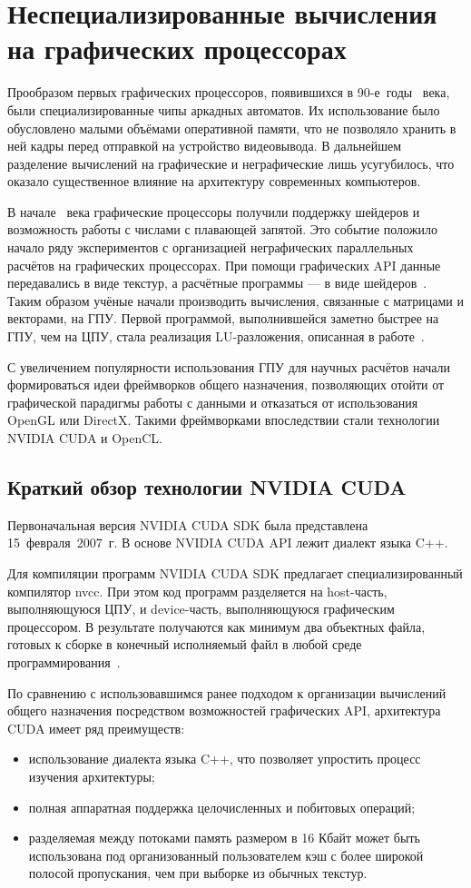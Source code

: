 \section{Неспециализированные вычисления на графических процессорах}

Прообразом первых графических процессоров, появившихся в 90-е~годы
~века, были специализированные чипы аркадных автоматов. Их использование было обусловлено малыми объёмами оперативной памяти, что не позволяло хранить в ней кадры перед отправкой на устройство видеовывода. В
дальнейшем разделение вычислений на графические и неграфические лишь
усугубилось, что оказало существенное влияние на архитектуру современных
компьютеров.

В начале ~века графические процессоры получили поддержку шейдеров и возможность работы с числами с плавающей запятой. Это событие положило начало ряду экспериментов с организацией неграфических параллельных
расчётов на графических процессорах. При помощи графических API данные
передавались в виде текстур, а расчётные программы --- в виде шейдеров~\cite{Berillo}.
Таким образом учёные начали производить вычисления, связанные с матрицами и векторами, на ГПУ. Первой программой, выполнившейся заметно быстрее
на ГПУ, чем на ЦПУ, стала реализация LU-разложения, описанная в работе~\cite{Galoppo}.

С увеличением популярности использования ГПУ для научных расчётов
начали формироваться идеи фреймворков общего назначения, позволяющих
отойти от графической парадигмы работы с данными и отказаться от использования OpenGL или DirectX. Такими фреймворками впоследствии стали технологии NVIDIA CUDA и OpenCL.

\subsection{Краткий обзор технологии NVIDIA CUDA}

Первоначальная версия NVIDIA CUDA SDK была представлена 15~февраля~2007~г.
В основе NVIDIA CUDA API лежит диалект языка C++.

Для компиляции программ NVIDIA CUDA SDK предлагает специализированный компилятор nvcc. При этом код программ разделяется на host-часть, выполняющуюся ЦПУ, и device-часть, выполняющуюся графическим процессором. В результате получаются как минимум два объектных файла, готовых к сборке в
конечный исполняемый файл в любой среде программирования~\cite{CUDADoc}.

По сравнению с использовавшимся ранее подходом к организации вычислений общего назначения посредством возможностей графических API, архитектура CUDA имеет ряд преимуществ:
\begin{itemize}
\item использование диалекта языка C++, что позволяет упростить процесс изучения архитектуры;
\item  полная аппаратная поддержка целочисленных и побитовых операций;
\item  разделяемая между потоками память размером в 16 Кбайт может быть
использована под организованный пользователем кэш с более широкой полосой пропускания, чем при выборке из обычных текстур.
\end{itemize}


